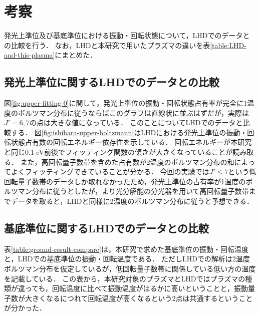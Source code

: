 \chapter{考察}
発光上準位及び基底準位における振動・回転状態について，LHDでのデータとの比較を行う．
なお，LHDと本研究で用いたプラズマの違いを表\ref{table:LHD-and-this-plasma}にまとめた\cite{ishihara}．

\section{発光上準位に関するLHDでのデータとの比較}
図\ref{fig:upper-fitting-0}に関して，発光上準位の振動・回転状態占有率が完全に1温度のボルツマン分布に従うならばこのグラフは直線状に並ぶはずだが，実際は$J'=6,7$の点は大きな値になっている．
このことについてLHDでのデータと比較する．
図\ref{fig:ishihara-upper-boltzmann}はLHDにおける発光上準位の振動・回転状態占有数の回転エネルギー依存性を示している\cite{ishihara}．
回転エネルギーが本研究と同じ0.1 eV前後でフィッティング関数の傾きが大きくなっていることが読み取る．
また，高回転量子数帯を含めた占有数が2温度のボルツマン分布の和によってよくフィッティングできていることが分かる．
今回の実験では$J' \leq 7$という低回転量子数帯のデータしか取れなかったため，発光上準位の占有率が1温度のボルツマン分布に従うとしたが，より光分解能の分光器を用いて高回転量子数帯までデータを取ると，LHDと同様に2温度のボルツマン分布に従うと予想できる．

\section{基底準位に関するLHDでのデータとの比較}
表\ref{table:ground-result-compare}は，本研究で求めた基底準位の振動・回転温度と，LHDでの基底準位の振動・回転温度\cite{ishihara}である．
ただしLHDでの解析は2温度ボルツマン分布を仮定しているが，低回転量子数帯に関係している低い方の温度を記載している．
この表から，本研究対象のプラズマとLHDではプラズマの種類が違っても，回転温度に比べて振動温度がはるかに高いということと，振動量子数が大きくなるにつれて回転温度が高くなるという2点は共通するということが分かった．

\begin{comment}
図\ref{fig:upper-fitting-0}に関して，発光上準位の振動・回転状態占有率が完全にボルツマン分布に従うとするとこのグラフは直線になるはずだが，実際は$v'=0$の$J'=6,7$の点は大きな値になっている．
このことから，回転温度は視線方向に一定ではないことが考えられる．
高回転量子数域を含めた発光上準位の占有数のボルツマンプロットが直線から外れることは，他のプラズマでも報告されている．
図\ref{fig:ishihara-upper-boltzmann}は，岐阜県土岐市の核融合科学研究所にある大型ヘリカル装置(LHD)でのプラズマにおける，発光上準位における占有数のボルツマンプロットである\cite{ishihara}．
図中の点線は高低2温度のボルツマン分布を仮定したフィッティング結果であり，良く近似できていることが分かる．
また，発光上準位の占有数分布が2温度のボルツマン分布で良く近似できることは，放電の種類に関わらず複数計測されている\cite{ishihara, two-temperature-1, two-temperature-2}．
本研究の対称としたプラズマでも，より光分解能の分光器を用いて高回転量子数域までデータを取り，2温度のボルツマン分布を仮定することで，正確な占有率を計算することができると考えられる．
\end{comment}